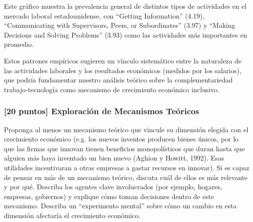 \documentclass{article}
\theoremstyle{remark}
\theoremstyle{definition}
\begin{document}
\begin{tcolorbox}
Este gráfico muestra la prevalencia general de distintos tipos de actividades en el mercado laboral estadounidense, con ``Getting Information'' (4.19), ``Communicating with Supervisors, Peers, or Subordinates'' (3.97) y ``Making Decisions and Solving Problems'' (3.93) como las actividades más importantes en promedio.

Estos patrones empíricos sugieren un vínculo sistemático entre la naturaleza de las actividades laborales y los resultados económicos (medidos por los salarios), que podría fundamentar nuestro análisis teórico sobre la complementariedad trabajo-tecnología como mecanismo de crecimiento económico inclusivo.

\end{tcolorbox}

\subsubsection{[20 puntos] Exploración de Mecanismos Teóricos}

Proponga al menos un mecanismo teórico que vincule su dimensión elegida con el crecimiento económico (e.g. los nuevos inventos producen bienes únicos, por lo que las firmas que innovan tienen beneficios monopolísticos que duran hasta que alguien más haya inventado un bien nuevo (Aghion y Howitt, 1992). Esas utilidades incentivaran a otras empresas a gastar recursos en innovar). Si es capaz de pensar en más de un mecanismo teórico, discuta cuál de ellos es más relevante y por qué. Describa los agentes clave involucrados (por ejemplo, hogares, empresas, gobiernos) y explique cómo toman decisiones dentro de este mecanismo. Describa un ``experimento mental'' sobre cómo un cambio en esta dimensión afectaría el crecimiento económico.
\end{document}
